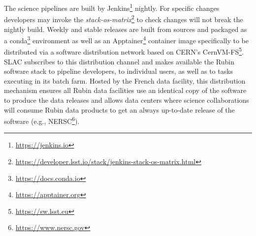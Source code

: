 The science pipelines are built by Jenkins\footnote{\url{https://jenkins.io}} nightly.\cite{2018SPIE10707E..09J}
For specific changes developers may invoke the \emph{stack-os-matrix}\footnote{\url{https://developer.lsst.io/stack/jenkins-stack-os-matrix.html}} to check changes will not break the nightly build. Weekly and stable releases are built from sources and packaged as a conda\footnote{\url{https://docs.conda.io}} environment as well as an Apptainer\footnote{\url{https://apptainer.org}} container image specifically to be distributed via a software distribution network based on CERN's CernVM-FS\footnote{\url{https://sw.lsst.eu}}. SLAC subscribes to this distribution channel and makes available the Rubin software stack to pipeline developers, to individual users, as well as to tasks executing in its batch farm. Hosted by the French data facility, this distribution mechanism ensures all Rubin data facilities use an identical copy of the software to produce the data releases and allows data centers where science collaborations will consume Rubin data products to get an always up-to-date release of the software (e.g., NERSC\footnote{\url{https://www.nersc.gov}}).

